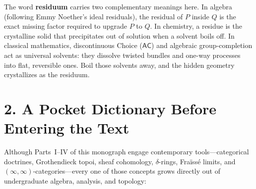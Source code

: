\documentclass[10pt,twoside,openright]{book}
\theoremstyle{crmplain}
\theoremstyle{crmdef}
\theoremstyle{crmremark}
\begin{document}
The word \textbf{residuum} carries two complementary meanings here. In algebra (following Emmy Noether's ideal residuals), the residual of $P$ inside $Q$ is the exact missing factor required to upgrade $P$ to $Q$. In chemistry, a residue is the crystalline solid that precipitates out of solution when a solvent boils off. In classical mathematics, discontinuous Choice ($\mathsf{AC}$) and algebraic group-completion act as universal solvents: they dissolve twisted bundles and one-way processes into flat, reversible ones. Boil those solvents away, and the hidden geometry crystallizes as the residuum.

\section*{2. A Pocket Dictionary Before Entering the Text}

Although Parts~I--IV of this monograph engage contemporary tools---categorical doctrines, Grothendieck topoi, sheaf cohomology, $\delta$-rings, Fra\"iss\'e limits, and $(\infty, \infty)$-categories---every one of those concepts grows directly out of undergraduate algebra, analysis, and topology:
\end{document}
